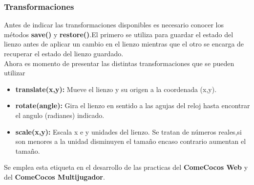 \subsubsection*{Transformaciones}
Antes de indicar las transformaciones disponibles es necesario conocer los métodos \textbf{save()} y \textbf{restore()}.El primero se utiliza para guardar el estado del lienzo antes de aplicar un cambio en el lienzo mientras que el otro se encarga de recuperar el estado del lienzo guardado.
\\Ahora es momento de presentar las distintas transformaciones que se pueden utilizar
\begin{itemize}
\item \textbf{translate(x,y):} Mueve el lienzo y su origen a la coordenada (x,y).
\item\textbf{ rotate(angle):} Gira el lienzo en sentido a las agujas del reloj hasta encontrar el angulo (radianes) indicado.
\item \textbf{scale(x,y):} Escala x e y unidades del lienzo. Se tratan de números reales,si son menores a la unidad disminuyen el tamaño encaso contrario aumentan el tamaño.
\end{itemize}
Se emplea esta etiqueta en el desarrollo de las practicas del\textbf{ ComeCocos Web} y del \textbf{ComeCocos Multijugador}.
